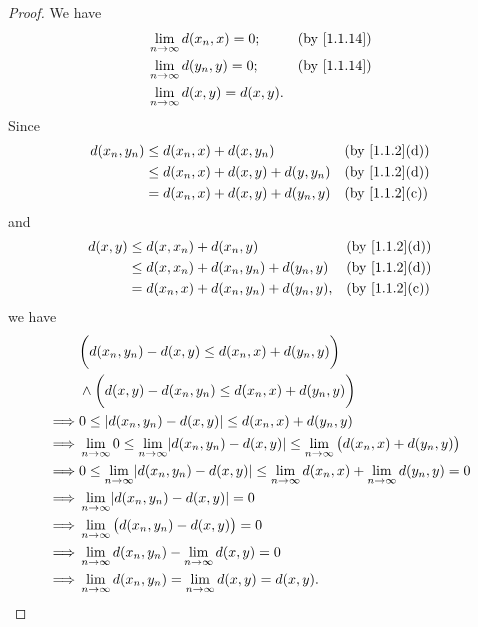 \begin{proof}
  We have
  \begin{align*}
     & \lim_{n \to \infty} d(x_n, x) = 0;       &  & \by{1.1.14} \\
     & \lim_{n \to \infty} d(y_n, y) = 0;       &  & \by{1.1.14} \\
     & \lim_{n \to \infty} d(x, y)   = d(x, y).
  \end{align*}
  Since
  \begin{align*}
    d(x_n, y_n) & \leq d(x_n, x) + d(x, y_n)           &  & \text{(by \cref{1.1.2}(d))} \\
                & \leq d(x_n, x) + d(x, y) + d(y, y_n) &  & \text{(by \cref{1.1.2}(d))} \\
                & = d(x_n, x) + d(x, y) + d(y_n, y)    &  & \text{(by \cref{1.1.2}(c))}
  \end{align*}
  and
  \begin{align*}
    d(x, y) & \leq d(x, x_n) + d(x_n, y)               &  & \text{(by \cref{1.1.2}(d))} \\
            & \leq d(x, x_n) + d(x_n, y_n) + d(y_n, y) &  & \text{(by \cref{1.1.2}(d))} \\
            & = d(x_n, x) + d(x_n, y_n) + d(y_n, y),   &  & \text{(by \cref{1.1.2}(c))}
  \end{align*}
  we have
  \begin{align*}
             & \bigg(d(x_n, y_n) - d(x, y) \leq d(x_n, x) + d(y_n, y)\bigg)                                                                        \\
             & \land \bigg(d(x, y) - d(x_n, y_n) \leq d(x_n, x) + d(y_n, y)\bigg)                                                                  \\
    \implies & 0 \leq \abs{d(x_n, y_n) - d(x, y)} \leq d(x_n, x) + d(y_n, y)                                                                       \\
    \implies & \lim_{n \to \infty} 0 \leq \lim_{n \to \infty} \abs{d(x_n, y_n) - d(x, y)} \leq \lim_{n \to \infty} \big(d(x_n, x) + d(y_n, y)\big) \\
    \implies & 0 \leq \lim_{n \to \infty} \abs{d(x_n, y_n) - d(x, y)} \leq \lim_{n \to \infty} d(x_n, x) + \lim_{n \to \infty} d(y_n, y) = 0       \\
    \implies & \lim_{n \to \infty} \abs{d(x_n, y_n) - d(x, y)} = 0                                                                                 \\
    \implies & \lim_{n \to \infty} \big(d(x_n, y_n) - d(x, y)\big) = 0                                                                             \\
    \implies & \lim_{n \to \infty} d(x_n, y_n) - \lim_{n \to \infty} d(x, y) = 0                                                                   \\
    \implies & \lim_{n \to \infty} d(x_n, y_n) = \lim_{n \to \infty} d(x, y) = d(x, y).
  \end{align*}
\end{proof}